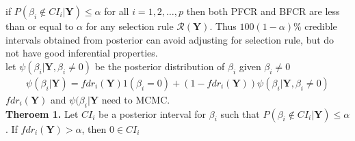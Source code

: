 \documentclass[11pt]{article}
\begin{document}
if $P(\beta_i \notin CI_i | \boldsymbol{Y}) \le \alpha$ for all $i = 1,2, \dots ,p$ then both PFCR and BFCR are less than or equal to $\alpha$ for any selection rule $\mathcal{R}(\boldsymbol{Y})$. Thus $100(1-\alpha)\%$ credible intervals obtained from posterior can avoid adjusting for selection rule, but do not have good inferential properties.\\

let $\psi(\beta_i|\boldsymbol{Y},\beta_i \ne 0)$ be the posterior distribution of $\beta_i$ given $\beta_i \ne 0$
\begin{align*}
\psi(\beta_i | \boldsymbol{Y}) = fdr_i(\boldsymbol{Y})1(\beta_i=0) + (1 - fdr_i(\boldsymbol{Y}))\psi(\beta_i|\boldsymbol{Y},\beta_i \ne 0)
\end{align*}
$fdr_i(\boldsymbol{Y}) $ and $\psi(\beta_i|\boldsymbol{Y}$ need to MCMC.\\

\textbf{Theroem 1.} Let $CI_i$ be a posterior interval for $\beta_i$ such that $P(\beta_i \notin CI_i | \boldsymbol{Y}) \le \alpha$ . If $fdr_i(\boldsymbol{Y}) >\alpha$, then $0\in CI_i$
\end{document}

